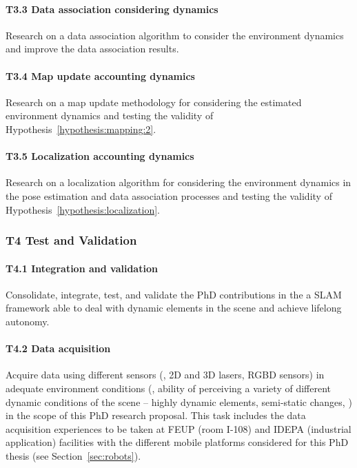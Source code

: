 \paragraph{T3.3 Data association considering dynamics} Research on a data association algorithm to consider the environment dynamics and improve the data association results.

\paragraph{T3.4 Map update accounting dynamics} Research on a map update methodology for considering the estimated environment dynamics and testing the validity of Hypothesis~\ref{hypothesis:mapping:2}.

\paragraph{T3.5 Localization accounting dynamics} Research on a localization algorithm for considering the environment dynamics in the pose estimation and data association processes and testing the validity of Hypothesis~\ref{hypothesis:localization}.

\subsubsection*{T4 Test and Validation}

\paragraph{T4.1 Integration and validation} Consolidate, integrate, test, and validate the PhD contributions in the a \gls{SLAM} framework able to deal with dynamic elements in the scene and achieve lifelong autonomy.

\paragraph{T4.2 Data acquisition} Acquire data using different sensors (\eg, 2D and 3D lasers, RGBD sensors) in adequate environment conditions (\ie, ability of perceiving a variety of different dynamic conditions of the scene -- highly dynamic elements, semi-static changes, \etc) in the scope of this PhD research proposal.
This task includes the data acquisition experiences to be taken at \gls{FEUP} (room I-108) and IDEPA (industrial application) facilities with the different mobile platforms considered for this PhD thesis (see Section~\ref{sec:robots}).

